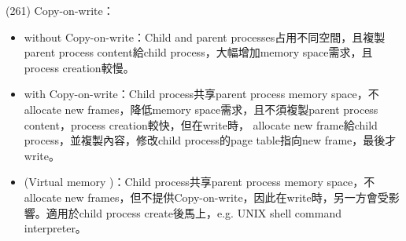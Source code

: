 \begin{theorem}{(261)} Copy-on-write：\begin{itemize}
        \item {} without Copy-on-write：Child and parent processes占用不同空間，且複製parent process content給child process，大幅增加memory space需求，且process creation較慢。
        \item {} with Copy-on-write：Child process共享parent process memory space，不allocate new frames，降低memory space需求，且不須複製parent process content，process creation較快，但在write時，
        allocate new frame給child process，並複製內容，修改child process的page table指向new frame，最後才write。
        \item {} (Virtual memory )：Child process共享parent process memory space，不allocate new frames，但不提供Copy-on-write，因此在write時，另一方會受影響。適用於child process create後馬上，e.g. UNIX shell command interpreter。
    \end{itemize}
\end{theorem}
